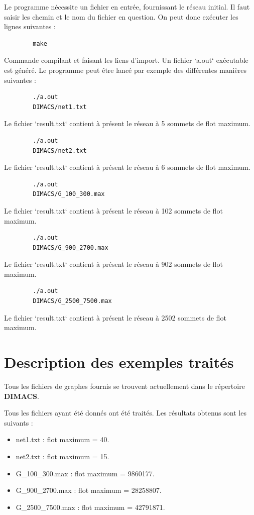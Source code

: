 \documentclass[11pt, a4paper]{report}
\begin{document}
	Le programme nécessite un fichier en entrée, fournissant le réseau initial. Il faut saisir les chemin et le nom du fichier en question. On peut donc exécuter les lignes suivantes :
	\lstset{language=bash}
	\begin{lstlisting}
		make
	\end{lstlisting}
	Commande compilant et faisant les liens d'import. Un fichier `a.out` exécutable est généré. Le programme peut être lancé par exemple des différentes manières suivantes :
	
	\begin{lstlisting}
		./a.out
		DIMACS/net1.txt
	\end{lstlisting}
	Le fichier `result.txt` contient à présent le réseau à 5 sommets de flot maximum.
	
	\begin{lstlisting}
		./a.out
		DIMACS/net2.txt
	\end{lstlisting}
	Le fichier `result.txt` contient à présent le réseau à 6 sommets de flot maximum.
	
	\begin{lstlisting}
		./a.out
		DIMACS/G_100_300.max
	\end{lstlisting}
	Le fichier `result.txt` contient à présent le réseau à 102 sommets de flot maximum.
	
	\begin{lstlisting}
		./a.out
		DIMACS/G_900_2700.max
	\end{lstlisting}
	Le fichier `result.txt` contient à présent le réseau à 902 sommets de flot maximum.
	
	\begin{lstlisting}
		./a.out
		DIMACS/G_2500_7500.max
	\end{lstlisting}
	Le fichier `result.txt` contient à présent le réseau à 2502 sommets de flot maximum.
	
	
	
	
	\chapter{Description des exemples traités}
	
	Tous les fichiers de graphes fournis se trouvent actuellement dans le répertoire \textbf{DIMACS}.
	
	Tous les fichiers ayant été donnés ont été traités. Les résultats obtenus sont les suivants :
	\begin{itemize}
        \item net1.txt : flot maximum = 40.
        \item net2.txt : flot maximum = 15.
        \item G\_100\_300.max : flot maximum = 9860177.
        \item G\_900\_2700.max : flot maximum = 28258807.
        \item G\_2500\_7500.max : flot maximum = 42791871.
	\end{itemize}
\end{document}
